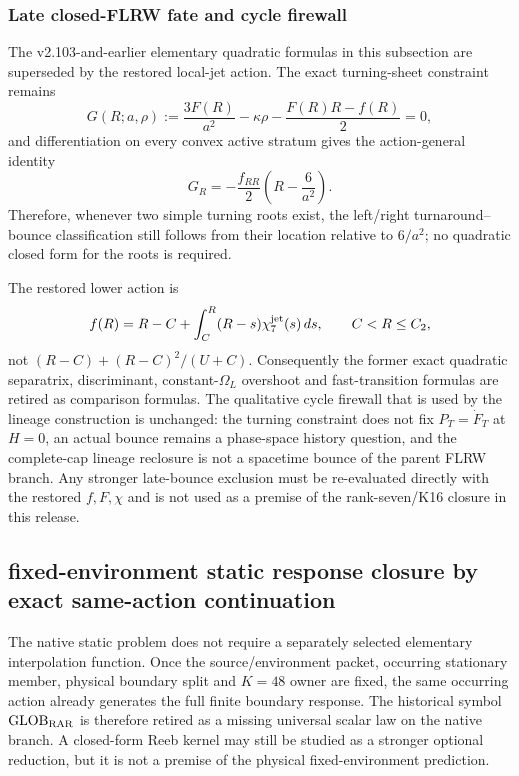\documentclass[12pt,a4paper]{article}
\begin{document}
\subsubsection{Late closed-FLRW fate and cycle firewall}
\label{p8:subsec:v2113-restored-late-cycle-firewall}
The v2.103-and-earlier elementary quadratic formulas in this subsection are
superseded by the restored local-jet action.  The exact turning-sheet
constraint remains
\[
 G(R;a,\rho):=\frac{3F(R)}{a^2}-\kappa\rho-
 \frac{F(R)R-f(R)}2=0,
\]
and differentiation on every convex active stratum gives the action-general
identity
\[
 \boxed{G_R=-\frac{f_{RR}}2\left(R-\frac6{a^2}\right).}
\]
Therefore, whenever two simple turning roots exist, the left/right
turnaround--bounce classification still follows from their location relative
to $6/a^2$; no quadratic closed form for the roots is required.

The restored lower action is
\[
 f(R)=R-C+\int_C^R(R-s)\chi_7^{\rm jet}(s)\,ds,
 \qquad C<R\le C_2,
\]
not $(R-C)+(R-C)^2/(U+C)$.  Consequently the former exact quadratic
separatrix, discriminant, constant-$\Omega_L$ overshoot and fast-transition
formulas are retired as comparison formulas.  The qualitative cycle firewall
that is used by the lineage construction is unchanged: the turning constraint
does not fix $P_T=\dot F_T$ at $H=0$, an actual bounce remains a phase-space
history question, and the complete-cap lineage reclosure is not a spacetime
bounce of the parent FLRW branch.  Any stronger late-bounce exclusion must be
re-evaluated directly with the restored $f,F,\chi$ and is not used as a premise
of the rank-seven/K16 closure in this release.

\subsection{fixed-environment static response closure by exact same-action continuation}
\label{p8:sec:v2123-fixed-environment-static-response}
The native static problem does not require a separately selected elementary
interpolation function.  Once the source/environment packet, occurring
stationary member, physical boundary split and $K=48$ owner are fixed, the
same occurring action already generates the full finite boundary response.
The historical symbol $\mathrm{GLOB}_{\rm RAR}$ is therefore retired as a
missing universal scalar law on the native branch.  A closed-form Reeb kernel
may still be studied as a stronger optional reduction, but it is not a
premise of the physical fixed-environment prediction.
\end{document}
